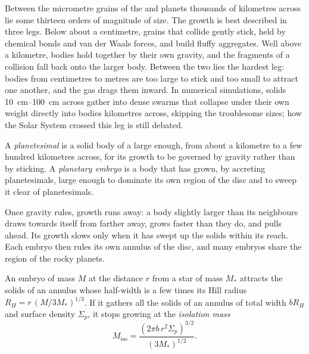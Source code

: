 Between the micrometre grains of the  and planets thousands
of kilometres across lie some thirteen orders of magnitude of size. The growth is
best described in three legs. Below about a centimetre, grains that collide
gently stick, held by chemical bonds and van der Waals forces, and build fluffy
aggregates. Well above a kilometre, bodies hold together by their own gravity,
and the fragments of a collision fall back onto the larger body. Between the two
lies the hardest leg: bodies from centimetres to metres are too large to stick
and too small to attract one another, and the gas drags them inward. In
numerical simulations, solids \qtyrange{10}{100}{cm} across gather into dense
swarms that collapse under their own weight directly into bodies kilometres
across, skipping the troublesome sizes; how the Solar System crossed this leg
is still debated.

\begin{definition}
\label{def:b2:planet-formation-meteorites:planetesimal}
A \emph{planetesimal} is a solid body of a  large enough, from about a kilometre to a few hundred kilometres across,
for its growth to be governed by gravity rather than by sticking. A
\emph{planetary embryo} is a body that has grown, by
accreting planetesimals, large enough to dominate its own region of the disc and
to sweep it clear of planetesimals.
\end{definition}

Once gravity rules, growth runs away: a body slightly larger than its
neighbours draws  towards itself from farther away, grows faster
than they do, and pulls ahead. Its growth slows only when it has swept up the
solids within its reach. Each embryo then rules its own annulus of the disc,
and many embryos share the region of the rocky planets.

\begin{proposition}\label{prop:b2:planet-formation-meteorites:isolation}
An embryo of mass $M$ at the distance $r$ from a star of mass $M_*$ attracts the
solids of an annulus whose half-width is a few times its Hill radius
$R_H = r\,(M/3M_*)^{1/3}$. If it gathers all the solids of an annulus of total
width $bR_H$ and surface density $\Sigma_p$, it stops growing at the
\emph{isolation mass}
\[
  M_{\mathrm{iso}} = \frac{(2\pi b\, r^2 \Sigma_p)^{3/2}}{(3M_*)^{1/2}} .
\]
\end{proposition}

